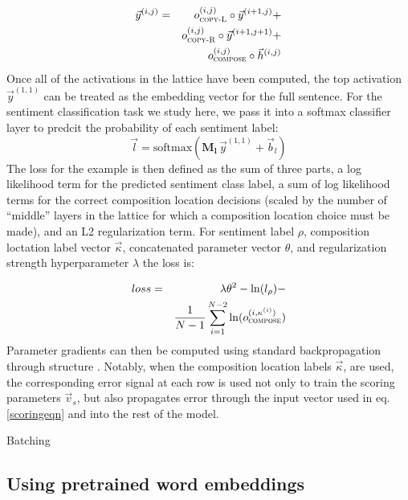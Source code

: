 \begin{eqnarray}
\vec{y}^{(i,j)} & = & o^{(i, j)}_{\textsc{copy-L}} \circ \vec{y}^{(i + 1, j)} +\\
&&\nonumber o^{(i, j)}_{\textsc{copy-R}} \circ \vec{y}^{(i + 1, j + 1)} +\\
&&\nonumber o^{(i, j)}_{\textsc{compose}} \circ \vec{h}^{(i, j)}
\end{eqnarray}
%
Once all of the activations in the lattice have been computed, the top activation $\vec{y}^{(1,1)}$ can be treated as the embedding vector for the full sentence. For the sentiment classification task we study here, we pass it into a softmax classifier layer to predcit the probability of each sentiment label:
%
\begin{equation}
\vec{l} = \text{softmax}(\mathbf{M_l}\,\vec{y}^{(1, 1)} + \vec{b}_l)
\end{equation}
%
The loss for the example is then defined as the sum of three parts, a log likelihood term for the predicted sentiment class label, a sum of log likelihood terms for the correct composition location decisions (scaled by the number of ``middle'' layers in the lattice for which a composition location choice must be made), and an L2 regularization term. For sentiment label $\rho$, composition loctation label vector $\vec{\kappa}$, concatenated parameter vector $\theta$, and regularization strength hyperparameter $\lambda$ the loss is:
%

\begin{eqnarray}
loss & = & \lambda\theta^2 - \ln(l_\rho) -\\
\nonumber&&\frac{1}{N - 1} \sum_{i = 1}^{N - 2} \ln(o^{(i,\kappa^{(i)})}_{\textsc{compose}})
\end{eqnarray}
%
Parameter gradients can then be computed using standard backpropagation through structure \cite{goller1996learning}. Notably, when the composition location labels $\vec{\kappa}$, are used, the corresponding error signal at each row is used not only to train the scoring parameters $\vec{v}_s$, but also propagates error through the input vector used in eq. \ref{scoringeqn} and into the rest of the model.

Batching

\subsection{Using pretrained word embeddings}

